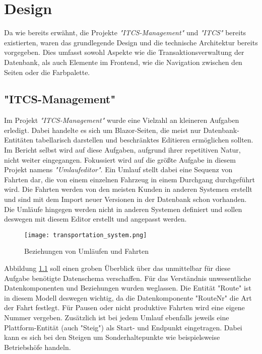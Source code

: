 \chapter{Design}\label{chap:design}

    Da wie bereits erwähnt, die Projekte \emph{"ITCS-Management"} und \emph{"ITCS"} bereits existierten, waren das grundlegende Design und die technische Architektur bereits vorgegeben.
    Dies umfasst sowohl Aspekte wie die Transaktionsverwaltung der Datenbank, als auch Elemente im Frontend, wie die Navigation zwischen den Seiten oder die Farbpalette.

\section{"ITCS-Management"}\label{sec:itcs-management-design}
    Im Projekt \emph{"ITCS-Management"} wurde eine Vielzahl an kleineren Aufgaben erledigt. Dabei handelte es sich um Blazor-Seiten, die meist nur Datenbank-Entitäten tabellarisch
    darstellen und beschränktes Editieren ermöglichen sollten. Im Bericht selbst wird auf diese Aufgaben, aufgrund ihrer repetitiven Natur, nicht weiter eingegangen. Fokussiert wird  
    auf die größte Aufgabe in diesem Projekt namens \emph{"Umlaufeditor"}. 
    Ein Umlauf stellt dabei eine Sequenz von Fahrten dar, die von einem einzelnen Fahrzeug in einem Durchgang durchgeführt wird. Die Fahrten werden von den meisten Kunden in anderen 
    Systemen erstellt und sind mit dem Import neuer Versionen in der Datenbank schon vorhanden. Die Umläufe hingegen werden nicht in anderen Systemen definiert und sollen deswegen
    mit diesem Editor erstellt und angepasst werden. 
    \begin{figure}[H]
        \centering
        \texttt{[image: transportation\_system.png]}
        \caption{Beziehungen von Umläufen und Fahrten}
        \label{fig:BeziehungenvonUmläufenundFahrten}
    \end{figure}

    Abbildung \ref{fig:BeziehungenvonUmläufenundFahrten} soll einen groben Überblick über das unmittelbar für diese Aufgabe benötigte Datenschema verschaffen. Für das Verständnis unwesentliche 
    Datenkomponenten und Beziehungen wurden weglassen. Die Entität "Route" ist in diesem Modell deswegen wichtig, da die Datenkomponente "RouteNr" die Art der Fahrt festlegt. Für Pausen oder nicht
    produktive
    Fahrten wird eine eigene Nummer vergeben. Zusätzlich ist bei jedem Umlauf ebenfalls jeweils eine Plattform-Entität (auch "Steig") als Start- und Endpunkt eingetragen. Dabei kann es sich bei den 
    Steigen um Sonderhaltepunkte wie beispielsweise Betriebshöfe handeln.

